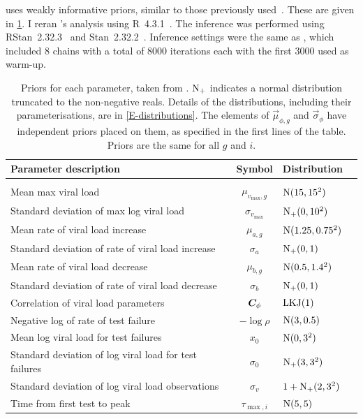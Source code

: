 \documentclass[thesis.tex]{subfiles}
\begin{document}
\textcite{hakkiOnset} uses weakly informative priors, similar to those previously used~\autocite{singanayagamCommunity}.
These are given in \cref{ATACCC:table:hakki-priors}.
I reran \textcite{hakkiOnset}'s analysis using R~4.3.1~\autocite{R-4-3-1}.
The inference was performed using RStan~2.32.3~\autocite{RStan-2-32-3} and Stan~2.32.2~\autocite{Stan-2-32-2}.
Inference settings were the same as \textcite{hakkiOnset}, which included 8 chains with a total of 8000 iterations each with the first 3000 used as warm-up.
\begin{table}
\begin{tabular}{l c l l}
    Parameter description & Symbol & Distribution \\
    \hline \\
    Mean max viral load & $\mu_{v_\text{max}, g}$ & $\operatorname{N}(15, 15^2)$ \\
    Standard deviation of max log viral load & $\sigma_{v_\text{max}}$ & $\operatorname{N}_+(0, 10^2)$ \\
    Mean rate of viral load increase & $\mu_{a, g}$ & $\operatorname{N}(1.25, 0.75^2)$ \\
    Standard deviation of rate of viral load increase & $\sigma_{a}$ & $\operatorname{N}_+(0, 1)$ \\
    Mean rate of viral load decrease & $\mu_{b, g}$ & $\operatorname{N}(0.5, 1.4^2)$ \\
    Standard deviation of rate of viral load decrease & $\sigma_{b}$ & $\operatorname{N}_+(0, 1)$ \\
    Correlation of viral load parameters & $\bm{C}_\phi$ & $\operatorname{LKJ}(1)$ \\
    Negative log of rate of test failure & $-\log \rho$ & $\operatorname{N}(3, 0.5)$ \\
    Mean log viral load for test failures & $x_0$ & $\operatorname{N}(0, 3^2)$ \\
    Standard deviation of log viral load for test failures & $\sigma_0$ & $\operatorname{N}_+(3, 3^2)$ \\
    Standard deviation of log viral load observations & $\sigma_v$ & $1 + \operatorname{N}_+(2, 3^2)$ \\
    Time from first test to peak & $\tau_{\max,i}$ & $\operatorname{N}(5,5)$
\end{tabular}
\caption[Viral load model priors]{Priors for each parameter, taken from \textcite{hakkiOnset}. $\operatorname{N}_+$ indicates a normal distribution truncated to the non-negative reals. Details of the distributions, including their parameterisations, are in \cref{E-distributions}. The elements of $\vec{\mu}_{\phi,g}$ and $\vec{\sigma}_\phi$ have independent priors placed on them, as specified in the first lines of the table. Priors are the same for all $g$ and $i$. \label{ATACCC:table:hakki-priors}}
\end{table}
\end{document}
